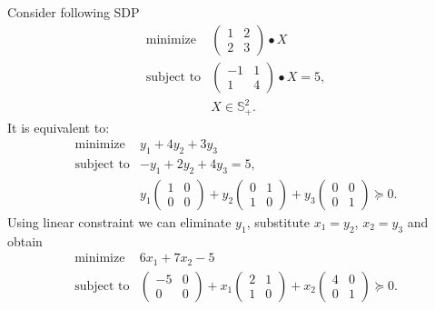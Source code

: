 \documentclass[10pt,oneside]{book}
\theoremstyle{definition}
\begin{document}
Consider following SDP
\begin{equation}
\begin{array}{ll}
\mbox{minimize} & \left(\begin{array}{rr}1&2\\ 2&3\end{array}\right)\bullet X \\
\mbox{subject to}& \left(\begin{array}{rr}-1&1\\ 1&4\end{array}\right)\bullet X = 5, \\
& X \in \mathbb{S}^2_+.
\end{array} 
\end{equation}
It is equivalent to:
\begin{equation}
\begin{array}{ll}
\mbox{minimize} & y_1 + 4y_2 + 3y_3 \\
\mbox{subject to}&  -y_1 + 2y_2 + 4y_3 = 5,\\ 
& y_1\left(\begin{array}{rr}1&0\\ 0&0\end{array}\right) 
+ y_2\left(\begin{array}{rr}0&1\\ 1&0\end{array}\right)
+ y_3\left(\begin{array}{rr}0&0\\ 0&1\end{array}\right)\succeq 0.
\end{array} 
\end{equation}
Using linear constraint we can eliminate $y_1$, substitute $x_1 = y_2$, $x_2 = y_3$ and obtain 
\begin{equation}
\label{exLMIresult}
\begin{array}{ll}
\mbox{minimize} &  6x_1 + 7x_2 -5 \\
\mbox{subject to}& \left(\begin{array}{rr}-5&0\\ 0&0\end{array}\right) 
+ x_1\left(\begin{array}{rr}2&1\\ 1&0\end{array}\right)
+ x_2\left(\begin{array}{rr}4&0\\ 0&1\end{array}\right)\succeq 0.
\end{array} 
\end{equation}
\end{document}
